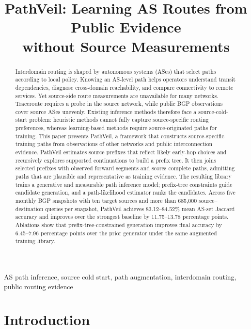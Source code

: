 \documentclass[conference]{IEEEtran}
\newcommand{\sys}{\mbox{PathVeil}\xspace}
\begin{document}
\title{PathVeil: Learning AS Routes from Public Evidence\\without Source Measurements}
\author{}
\maketitle

\begin{abstract}
Interdomain routing is shaped by autonomous systems (ASes) that select
paths according to local policy. Knowing an AS-level path helps operators
understand transit dependencies, diagnose cross-domain reachability, and
compare connectivity to remote services. Yet source-side route measurements
are unavailable for many networks. Traceroute requires a probe in the source
network, while public BGP observations cover source ASes unevenly. Existing
inference methods therefore face a source-cold-start problem: heuristic
methods cannot fully capture source-specific routing preferences, whereas
learning-based methods require source-originated paths for training. This
paper presents \sys, a framework that constructs source-specific training
paths from observations of other networks and public interconnection
evidence. \sys estimates source prefixes that reflect likely early-hop
choices and recursively explores supported continuations to build a prefix
tree. It then joins selected prefixes with observed forward segments and
scores complete paths, admitting paths that are plausible and representative
as training evidence. The resulting library trains a generative and
measurable path inference model; prefix-tree constraints guide candidate
generation, and a path-likelihood estimator ranks the candidates. Across
five monthly BGP snapshots with ten target sources and more than 685,000
source--destination queries per snapshot, \sys achieves 83.12--84.52\%
mean AS-set Jaccard accuracy and improves over the strongest baseline by
11.75--13.78 percentage points. Ablations show that prefix-tree-constrained
generation improves final accuracy by 6.45--7.96 percentage points over the
prior generator under the same augmented training library.

\end{abstract}

\begin{IEEEkeywords}
AS path inference, source cold start, path augmentation, interdomain routing,
public routing evidence
\end{IEEEkeywords}

\section{Introduction}
\label{sec:introduction}
\end{document}
